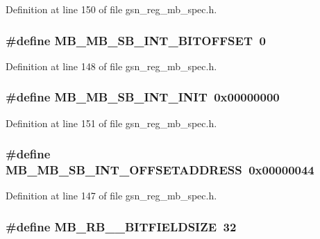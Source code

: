 Definition at line 150 of file gsn\_\-reg\_\-mb\_\-spec.h.

\hypertarget{a00562_a58c548799f52cff40bf3d94bd4154292}{
\subsubsection[{MB\_\-MB\_\-SB\_\-INT\_\-BITOFFSET}]{\setlength{\rightskip}{0pt plus 5cm}\#define MB\_\-MB\_\-SB\_\-INT\_\-BITOFFSET~0}}
\label{a00562_a58c548799f52cff40bf3d94bd4154292}


Definition at line 148 of file gsn\_\-reg\_\-mb\_\-spec.h.

\hypertarget{a00562_ab97e8b3330bc82ba4c36f499f8ff1e9a}{
\subsubsection[{MB\_\-MB\_\-SB\_\-INT\_\-INIT}]{\setlength{\rightskip}{0pt plus 5cm}\#define MB\_\-MB\_\-SB\_\-INT\_\-INIT~0x00000000}}
\label{a00562_ab97e8b3330bc82ba4c36f499f8ff1e9a}


Definition at line 151 of file gsn\_\-reg\_\-mb\_\-spec.h.

\hypertarget{a00562_aaf3221e349563181a33ba0843042eb9d}{
\subsubsection[{MB\_\-MB\_\-SB\_\-INT\_\-OFFSETADDRESS}]{\setlength{\rightskip}{0pt plus 5cm}\#define MB\_\-MB\_\-SB\_\-INT\_\-OFFSETADDRESS~0x00000044}}
\label{a00562_aaf3221e349563181a33ba0843042eb9d}


Definition at line 147 of file gsn\_\-reg\_\-mb\_\-spec.h.

\hypertarget{a00562_a68658cde3c61de8b0340d054108e7c51}{
\subsubsection[{MB\_\-RB\_\-0\_\-BITFIELDSIZE}]{\setlength{\rightskip}{0pt plus 5cm}\#define MB\_\-RB\_\_\-BITFIELDSIZE~32}}
\label{a00562_a68658cde3c61de8b0340d054108e7c51}


